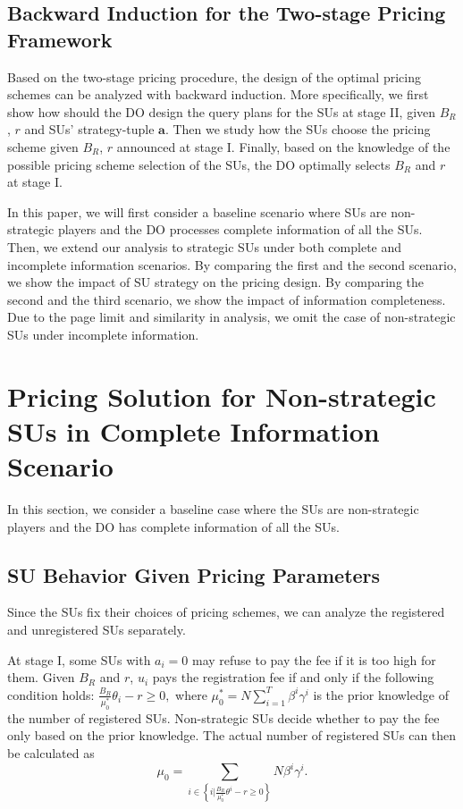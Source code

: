 \documentclass[journal]{IEEEtran}
\begin{document}
\subsection{Backward Induction for the Two-stage Pricing Framework}

Based on the two-stage pricing procedure, the design of the optimal pricing schemes can be analyzed with backward induction. More specifically, we first show how should the DO design the query plans for the SUs at stage II, given $B_R$, $r$ and SUs' strategy-tuple $\mathbf{a}$. Then we study how the SUs choose the pricing scheme given $B_R$, $r$ announced at stage I. Finally, based on the knowledge of the possible pricing scheme selection of the SUs, the DO optimally selects $B_R$ and $r$ at stage I.

In this paper, we will first consider a baseline scenario where SUs are non-strategic players and the DO processes complete information of all the SUs. Then, we extend our analysis to strategic SUs under both complete and incomplete information scenarios. By comparing the first and the second scenario, we show the impact of SU strategy on the pricing design. By comparing the second and the third scenario, we show the impact of information completeness. Due to the page limit and similarity in analysis, we omit the case of non-strategic SUs under incomplete information.

\section{Pricing Solution for Non-strategic SUs in Complete Information Scenario}
\label{sec:non-strategic_complete}

In this section, we consider a baseline case where the SUs are non-strategic players and the DO has complete information of all the SUs.

\subsection{SU Behavior Given Pricing Parameters}

Since the SUs fix their choices of pricing schemes, we can analyze the registered and unregistered SUs separately.

At stage I, some SUs with $a_i=0$ may refuse to pay the fee if it is too high for them. Given $B_R$ and $r$, $u_i$ pays the registration fee if and only if the following condition holds:
$
\frac{B_R}{\mu_0^*}\theta_i-r\geq 0,
$
where $\mu_0^*=N\sum_{i=1}^T\beta^i\gamma^i$ is the prior knowledge of the number of registered SUs. Non-strategic SUs decide whether to pay the fee only based on the prior knowledge.
The actual number of registered SUs can then be calculated as
\begin{equation}
\label{eqn:mu0}
\mu_0=\sum_{i\in\left\{i|\frac{B_R}{\mu_0^*}\theta^i-r\geq 0\right\}}N\beta^i\gamma^i.
\end{equation}
\end{document}

